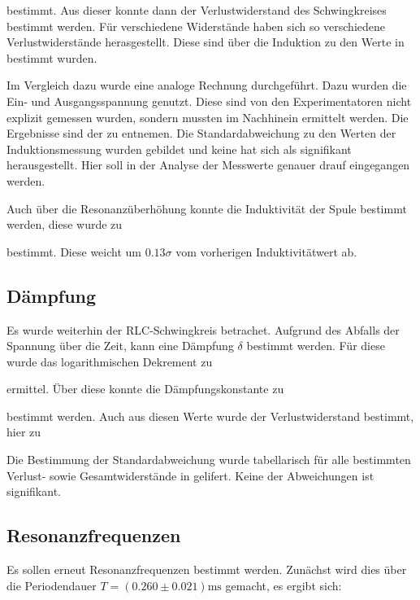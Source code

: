 
bestimmt.
Aus dieser konnte dann der Verlustwiderstand des Schwingkreises bestimmt werden. Für verschiedene Widerstände haben sich so verschiedene Verlustwiderstände herasgestellt. Diese sind über die Induktion zu den Werte in  bestimmt wurden.

Im Vergleich dazu wurde eine analoge Rechnung durchgeführt. Dazu wurden die Ein- und Ausgangsspannung genutzt. Diese sind von den Experimentatoren nicht explizit gemessen wurden, sondern mussten im Nachhinein ermittelt werden. Die Ergebnisse sind der  zu entnemen. Die Standardabweichung zu den Werten der Induktionsmessung wurden gebildet und keine hat sich als signifikant herausgestellt. Hier soll in der Analyse der Messwerte genauer drauf eingegangen werden.

Auch über die Resonanzüberhöhung konnte die Induktivität der Spule bestimmt werden, diese wurde zu


bestimmt. Diese weicht um $0.13\sigma$ vom vorherigen Induktivitätwert ab.

\subsection*{Dämpfung}

Es wurde weiterhin der RLC-Schwingkreis betrachet. Aufgrund des Abfalls der Spannung über die Zeit, kann eine Dämpfung $\delta$ bestimmt werden. Für diese wurde das logarithmischen Dekrement zu


ermittel. Über diese konnte die Dämpfungskonstante zu 


bestimmt werden. Auch aus diesen Werte wurde der Verlustwiderstand bestimmt, hier zu 


Die Bestimmung der Standardabweichung wurde tabellarisch für alle bestimmten Verlust- sowie Gesamtwiderstände in  gelifert. Keine der Abweichungen ist signifikant.

\subsection*{Resonanzfrequenzen}
Es sollen erneut Resonanzfrequenzen bestimmt werden. Zunächst wird dies über die Periodendauer $T = (0.260 \pm 0.021) \mathrm{ms}$ gemacht, es ergibt sich:

